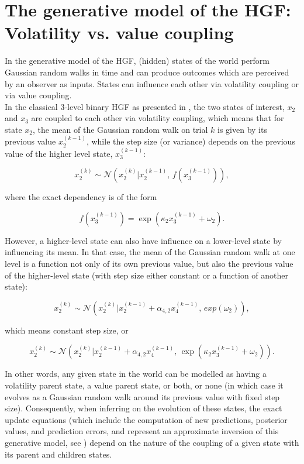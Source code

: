 \section{The generative model of the HGF: Volatility vs. value coupling}

In the generative model of the HGF, (hidden) states of the world perform Gaussian random walks in time and can produce outcomes which are perceived by an observer as inputs. States can influence each other via volatility coupling or via value coupling.\\

In the classical 3-level binary HGF as presented in \cite{Mathys2011}, the two states of interest, $x_2$ and $x_3$ are coupled to each other via volatility coupling, which means that for state $x_2$, the mean of the Gaussian random walk on trial $k$ is given by its previous value $x_2^{(k-1)}$, while the step size (or variance) depends on the previous value of the higher level state, $x_3^{(k-1)}$:

\begin{equation}
    x_2^{(k)} \sim \mathcal{N}(x_2^{(k)} | x_2^{(k-1)}, \, f(x_3^{(k-1)})), 
\end{equation} 

where the exact dependency is of the form

\begin{equation}
    f(x_3^{(k-1)}) = \exp(\kappa_2 x_3^{(k-1)} + \omega_2).
\end{equation}

However, a higher-level state can also have influence on a lower-level state by influencing its mean. In that case, the mean of the Gaussian random walk at one level is a function not only of its own previous value, but also the previous value of the higher-level state (with step size either constant or a function of another state):

\begin{equation}
    x_2^{(k)} \sim \mathcal{N}(x_2^{(k)} | x_2^{(k-1)} + \alpha_{4,2} x_4^{(k-1)}, \, exp(\omega_2)),
\end{equation}

which means constant step size, or

\begin{equation}
    x_2^{(k)} \sim \mathcal{N}(x_2^{(k)} | x_2^{(k-1)} + \alpha_{4,2} x_4^{(k-1)}, \, \exp(\kappa_2 x_3^{(k-1)} + \omega_2)).
\end{equation}

In other words, any given state in the world can be modelled as having a volatility parent state, a value parent state, or both, or none (in which case it evolves as a Gaussian random walk around its previous value with fixed step size). Consequently, when inferring on the evolution of these states, the exact update equations (which include the computation of new predictions, posterior values, and prediction errors, and represent an approximate inversion of this generative model, see \cite{Mathys2011}) depend on the nature of the coupling of a given state with its parent and children states.\\

